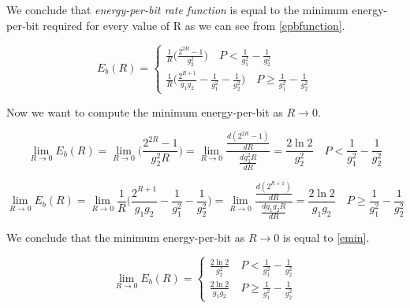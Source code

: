 We conclude that \textit{energy-per-bit rate function} is equal to the minimum energy-per-bit required for every value of R as we can see from \eqref{epbfunction}.

\begin{equation} E_b(R)=
	\begin{cases}
		\frac{1}{R}\Big(\frac{2^{2R}-1}{g_2^2}\Big) \quad P < \frac{1}{g_1^2} - \frac{1}{g_2^2}  \\
		\frac{1}{R} \Big(\frac{2^{R+1}}{g_1g_2} -\frac{1}{g_1^2} - \frac{1}{g_2^2} \Big)  \quad P \geq \frac{1}{g_1^2} - \frac{1}{g_2^2}
	\end{cases}
	\label{epbfunction}
\end{equation}

Now we want to compute the minimum energy-per-bit as $R \rightarrow 0$.


\begin{equation}
	\lim_{R \rightarrow 0} E_b(R) =
		\lim_{R \rightarrow 0} \Big(\frac{2^{2R}-1}{g_2^2 R}\Big) = \lim_{R \rightarrow 0} \frac{ \frac{d(2^{2R}-1)}{dR}} {\frac{dg_2^2 R}{dR}}=\frac{2\ln{2}}{g_2^2} \quad P < \frac{1}{g_1^2} - \frac{1}{g_2^2}
\end{equation}

\begin{equation}
		\lim_{R \rightarrow 0} E_b(R) =
		\lim_{R \rightarrow 0} \frac{1}{R} \Big(\frac{2^{R+1}}{g_1g_2} -\frac{1}{g_1^2} - \frac{1}{g_2^2} \Big) = \lim_{R \rightarrow 0} \frac{ \frac{d(2^{R+1})}{dR}} {\frac{dg_1g_2 R}{dR}}=\frac{2\ln{2}}{g_1g_2}  \quad P \geq \frac{1}{g_1^2} - \frac{1}{g_2^2}
\end{equation}

We conclude that the minimum energy-per-bit as $R \rightarrow 0$ is equal to \eqref{emin}.

\begin{equation}
	\lim_{R \rightarrow 0} E_b(R) = \begin{cases}
		\frac{2\ln{2}}{g_2^2} \quad P < \frac{1}{g_1^2} - \frac{1}{g_2^2} \\
		\frac{2\ln{2}}{g_1g_2} \quad P \geq \frac{1}{g_1^2} - \frac{1}{g_2^2}
\end{cases}
\label{emin}
\end{equation}
